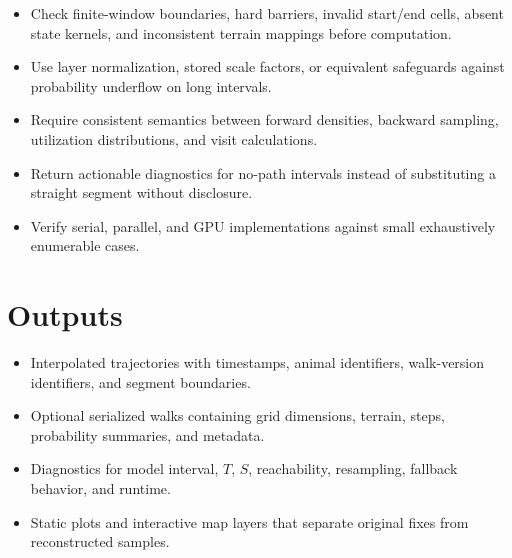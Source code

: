 \begin{itemize}
  \item Check finite-window boundaries, hard barriers, invalid start/end cells, absent state kernels, and inconsistent terrain mappings before computation.
  \item Use layer normalization, stored scale factors, or equivalent safeguards against probability underflow on long intervals.
  \item Require consistent semantics between forward densities, backward sampling, utilization distributions, and visit calculations.
  \item Return actionable diagnostics for no-path intervals instead of substituting a straight segment without disclosure.
  \item Verify serial, parallel, and GPU implementations against small exhaustively enumerable cases.
\end{itemize}

\section{Outputs}

\begin{itemize}
  \item Interpolated trajectories with timestamps, animal identifiers, walk-version identifiers, and segment boundaries.
  \item Optional serialized walks containing grid dimensions, terrain, steps, probability summaries, and metadata.
  \item Diagnostics for model interval, $T$, $S$, reachability, resampling, fallback behavior, and runtime.
  \item Static plots and interactive map layers that separate original fixes from reconstructed samples.
\end{itemize}
